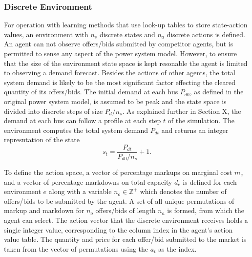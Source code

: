 \subsubsection{Discrete Environment}
For operation with learning methods that use look-up tables to store
state-action values, an environment with $n_s$ discrete states and $n_a$
discrete actions is defined.  An agent can not observe offers/bids submitted by competitor agents, but is permitted to sense any aspect of the power system
model.  However, to ensure that the size of the environment state space is kept
resonable the agent is limited to observing a demand forecast.  Besides the
actions of other agents, the total system demand is likely to be the most
significant factor effecting the cleared quantity of its offers/bids.  The
initial demand at each bus $P_{d0}$, as defined in the original power system
model, is assumed to be peak and the state space is divided into discrete steps
of size $P_d / n_s$.  As explained further in Section X, the demand at each bus
can follow a profile at each step $t$ of the simulation.  The environment
computes the total system demand $P_{d t}$ and returns an integer
represntation of the state
\begin{equation}
s_t = \frac{P_{d t}}{P_{d0} / n_s} + 1.
\end{equation}

To define the action space, a vector of percentage markups on marginal cost
$m_e$ and a vector of percentage markdowns on total capacity $d_e$ is defined
for each environment $e$ along with a variable $n_o \in \mathbb{Z}^+$ which
denotes the number of offers/bids to be submitted by the agent.  A set of all
unique permutations of markup and markdown for $n_o$ offers/bids of length
$n_a$ is formed, from which the agent can select.  The action vector that the
discrete environment receives holds a single integer value, corresponding to
the column index in the agent's action value table.  The quantity and price for
each offer/bid submitted to the market is taken from the vector of permutations
using the $a_t$ as the index.



